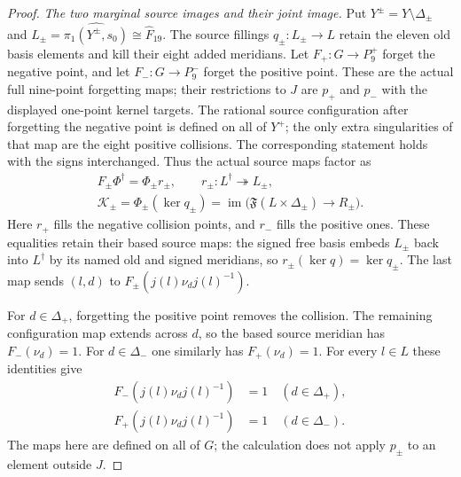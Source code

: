\begin{proof}
\emph{The two marginal source images and their joint image.}
Put $Y^\pm=Y\setminus\Delta_\pm$ and
$L_\pm=\widehat{\pi_1(Y^\pm,s_0)}\cong\widehat F_{19}$.
The source fillings $q_\pm:L_\pm\to L$ retain
the eleven old basis elements and kill their
eight added meridians.
Let $F_+:G\to P_9^+$ forget the negative point,
and let $F_-:G\to P_9^-$ forget the positive point.
These are the actual full nine-point forgetting
maps; their restrictions to $J$ are $p_+$ and
$p_-$ with the displayed one-point kernel targets.
The rational source configuration after forgetting
the negative point is defined on all of $Y^+$;
the only extra singularities of that map are
the eight positive collisions. The corresponding
statement holds with the signs interchanged.
Thus the actual source maps factor as
\[
 \begin{gathered}
 F_\pm\Phi^\dagger
       =\Phi_\pm r_\pm,
       \qquad r_\pm:L^\dagger\twoheadrightarrow L_\pm,\\
 \mathcal K_\pm
       =\Phi_\pm(\ker q_\pm)
       =\operatorname{im}
        \bigl(\mathfrak F(L\times\Delta_\pm)
                                \longrightarrow R_\pm\bigr).
 \end{gathered}                                                \tag{F.22.21}
\]
Here $r_+$ fills the negative collision points,
and $r_-$ fills the positive ones.
These equalities retain their based source maps:
the signed free basis embeds $L_\pm$ back into
$L^\dagger$ by its named old and signed meridians,
so $r_\pm(\ker q)=\ker q_\pm$.
The last map sends $(l,d)$ to
$F_\pm(j(l)\nu_dj(l)^{-1})$.

For $d\in\Delta_+$, forgetting the positive
point removes the collision. The remaining
configuration map extends across $d$, so the
based source meridian has $F_-(\nu_d)=1$.
For $d\in\Delta_-$ one similarly has
$F_+(\nu_d)=1$.
For every $l\in L$ these identities give
\[
 \begin{aligned}
 F_-(j(l)\nu_dj(l)^{-1})&=1\quad(d\in\Delta_+),\\
 F_+(j(l)\nu_dj(l)^{-1})&=1\quad(d\in\Delta_-).
 \end{aligned}                                                \tag{F.22.22}
\]
The maps here are defined on all of $G$;
the calculation does not apply $p_\pm$ to
an element outside $J$.


\end{proof}
